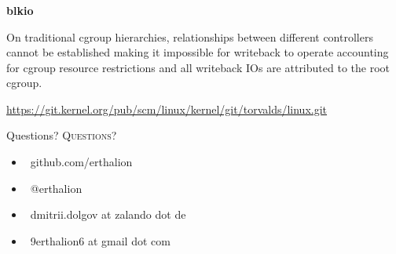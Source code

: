 \documentclass[usenames,dvipsnames, 18pt, compress, aspectratio=169]{beamer}
\def\twitter{{\FA \faTwitter}}
\def\github{{\FA \faGithub}}
\def\email{{\FA \faEnvelope}}
\begin{document}
\begin{frame}
    \frametitle{}
    \begin{center}
    \textbf{blkio}

		\begin{flushleft}
		On traditional cgroup hierarchies, relationships between different controllers
		cannot be established making it impossible for writeback to operate accounting
		for cgroup resource restrictions and all writeback IOs are attributed to the
		root cgroup.

        \normalsize{\href{
            https://git.kernel.org/pub/scm/linux/kernel/git/torvalds/linux.git/commit/?h=v4.14-rc4&id=3e1534cf4a2a8278e811e7c84a79da1a02347b8b
        }{https://git.kernel.org/pub/scm/linux/kernel/git/torvalds/linux.git}}
		\end{flushleft}

    \end{center}
\end{frame}

\fontsize{18pt}{18}\selectfont
\begin{frame}
  \vspace*{2.5cm}
  \begin{minipage}[b][\paperheight]{\textwidth}
  \begin{center}

      \linespread{1.0}%
      \if@noSmallCapitals%
        Questions?
      \else%
        \scshape{\color{black} Questions?}%
      \fi%
      \vspace*{0.3em}

      \fontsize{13pt}{14}\selectfont
        \begin{itemize}[label={}]
            \item {\color{black} \github\ github.com/erthalion}
            \item {\color{black} \twitter\ @erthalion}
            \item {\color{black}\email\ dmitrii.dolgov at zalando dot de}
            \item {\color{black}\email\ 9erthalion6 at gmail dot com}
        \end{itemize}
      \vspace*{2.5em}%

    \vfill
    \vspace*{2em}
  \end{center}
  \end{minipage}

\end{frame}
\end{document}
